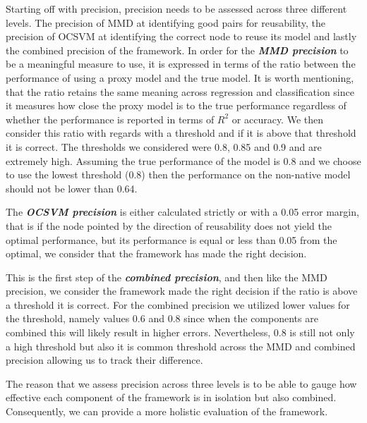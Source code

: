 \documentclass{mpaper}
\begin{document}
Starting off with precision, precision needs to be assessed across three different levels. The precision of MMD at identifying good pairs for reusability, the precision of OCSVM at identifying the correct node to reuse its model and lastly the combined precision of the framework. In order for the \textbf{\textit{MMD precision}} to be a meaningful measure to use, it is expressed in terms of the ratio between the performance of using a proxy model and the true model. It is worth mentioning, that the ratio retains the same meaning across regression and classification since it measures how close the proxy model is to the true performance regardless of whether the performance is reported in terms of $R^2$ or accuracy. We then consider this ratio with regards with a threshold and if it is above that threshold it is correct. The thresholds we considered were 0.8, 0.85 and 0.9 and are extremely high. Assuming the true performance of the model is 0.8 and we choose to use the lowest threshold (0.8) then the performance on the non-native model should not be lower than 0.64. 

The \textbf{\textit{OCSVM precision}} is either calculated strictly or with a 0.05 error margin, that is if the node pointed by the direction of reusability does not yield the optimal performance, but its performance is equal or less than 0.05 from the optimal, we consider that the framework has made the right decision.  

This is the first step of the \textbf{\textit{combined precision}}, and  then like the MMD precision, we consider the framework made the right decision if the ratio is above a threshold it is correct. For the combined precision we utilized lower values for the threshold, namely values 0.6 and 0.8 since when the components are combined this will likely result in higher errors. Nevertheless, 0.8 is still not only a high threshold but also it is common threshold across the MMD and combined precision allowing us to track their difference. 

The reason that we assess precision across three levels is to be able to gauge how effective each component of the framework is in isolation but also combined. Consequently, we can provide a more holistic evaluation of the framework. 
\end{document}
